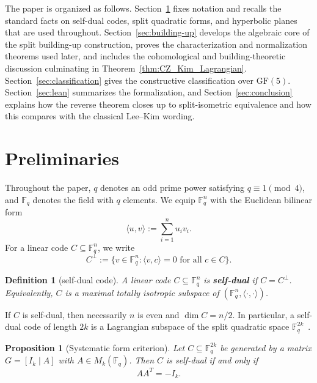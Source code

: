 \documentclass[12pt]{article}
\newtheorem{defn}{Definition}[section]
\newtheorem{prop}[theorem]{Proposition}
\newcommand{\F}{\mathbb{F}}
\newcommand{\GF}[1]{\ensuremath{\mathrm{GF}(#1)}}
\begin{document}
The paper is organized as follows. Section~\ref{sec:background} fixes notation and recalls the standard facts on self-dual codes, split quadratic forms, and hyperbolic planes that are used throughout. Section~\ref{sec:building-up} develops the algebraic core of the split building-up construction, proves the characterization and normalization theorems used later, and includes the cohomological and building-theoretic discussion culminating in Theorem~\ref{thm:CZ_Kim_Lagrangian}. Section~\ref{sec:classification} gives the constructive classification over $\GF{5}$. Section~\ref{sec:lean} summarizes the formalization, and Section~\ref{sec:conclusion} explains how the reverse theorem closes up to split-isometric equivalence and how this compares with the classical Lee--Kim wording.


\section{Preliminaries}
\label{sec:background}


Throughout the paper, $q$ denotes an odd prime power satisfying $q \equiv 1 \pmod 4$, and $\F_q$ denotes the field with $q$ elements. We equip $\F_q^n$ with the Euclidean bilinear form
\[
\langle u,v\rangle := \sum_{i=1}^n u_i v_i.
\]
For a linear code $C \subseteq \F_q^n$, we write
\[
C^\perp := \{v \in \F_q^n : \langle v,c\rangle = 0 \text{ for all } c \in C\}.
\]

\begin{defn}[self-dual code]\label{def:sd}
{\rm
A linear code $C \subseteq \F_q^n$ is \textbf{self-dual} if $C = C^{\perp}$. Equivalently, $C$ is a maximal totally isotropic subspace of $(\F_q^n,\langle \cdot,\cdot\rangle)$.
}
\end{defn}

\noindent
If $C$ is self-dual, then necessarily $n$ is even and $\dim C = n/2$.
 In particular, a self-dual code of length $2k$ is a Lagrangian subspace of the split quadratic space $\F_q^{2k}$~\cite{Mon}.

\begin{prop}[Systematic form criterion]\label{prop:systematic-form}
Let $C \subseteq \F_q^{2k}$ be generated by a matrix $G = [I_k \mid A]$ with $A \in M_k(\F_q)$. Then $C$ is self-dual if and only if
\[
AA^T = -I_k.
\]
\end{prop}
\end{document}
